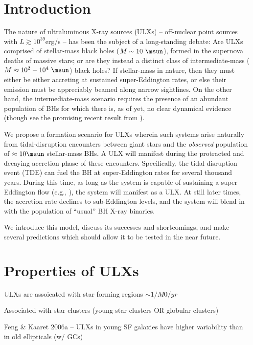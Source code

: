 \section{Introduction}\label{section:Intro}


The nature of ultraluminous X-ray sources (ULXs) -- off-nuclear point
sources with $L \gtrsim 10^{39}$erg/s -- has been the subject of a
long-standing debate: Are ULXs comprised of stellar-mass black holes 
($M \sim 10~\msun$), formed in the supernova deaths of massive stars; or
are they instead a distinct class of intermediate-mass ($M \approx 10^{2}-10^4~\msun$) black holes?  
If stellar-mass in nature, then
they must either be either accreting at sustained super-Eddington
rates, or else their emission must be appreciably beamed along narrow sightlines.    
On the other hand, the intermediate-mass scenario requires the presence of an
abundant population of BHs for which there is, as of yet, no clear
dynamical evidence (though see the promising recent result from
\citealt{Pasham_2014}).

We propose a formation scenario for ULXs wherein
such systems arise naturally from tidal-disruption encounters between
giant stars and the {\em observed} population of $\approx 10\msun$ stellar-mass BHs.  
A ULX will manifest during the protracted and decaying
accretion phase of these encounters.  Specifically, the tidal
disruption event (TDE) can fuel the BH at super-Eddington rates for
several thousand years.   During this time, as long as the system is capable of sustaining 
a super-Eddington flow (e.g., \citep{CITATIONS}), the system will manifest as a ULX.
At still later times, the accretion rate declines to sub-Eddington
levels, and the system will blend in with the population of
``usual'' BH X-ray binaries.

We introduce this model, discuss its successes and shortcomings, and make several predictions which should allow it to be tested in the near future.  

\section{Properties of ULXs}

ULXs are assoicated with star forming regions
$\sim 1 / M0/yr$

Associated with star clusters (young star clusters OR globular clusters)

Feng & Kaaret 2006a -- ULXs in young SF galaxies have higher variability than in old ellipticals (w/ GCs)

